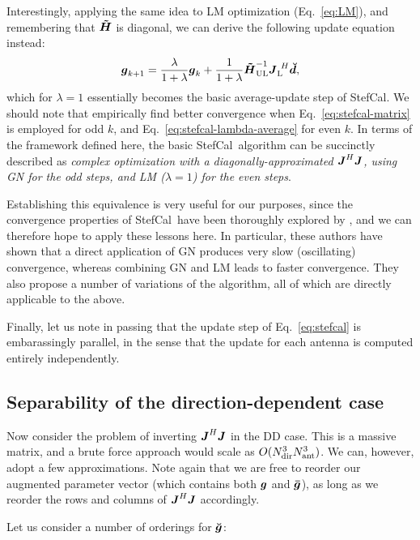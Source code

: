 \documentclass[useAMS,usenatbib]{mn2e}
\newcommand{\mat}[1]{{\bmath{#1}}}
\newcommand{\JJ}{\mat{J}} %
\newcommand{\HHa}{\mat{\tilde{H}}} %
\newcommand{\JHJ}{\JJ^H\JJ} %
\newcommand{\AUG}[1]{\bmath{\breve{#1}}}
\newcommand{\Gg}{\AUG{g}}
\newcommand{\Dd}{\AUG{d}}
\newcommand{\LEFT}{\mathrm{L}}
\newcommand{\UL}{\mathrm{UL}}%
\newcommand{\StefCal}{{\sc StefCal}}
\numberwithin{equation}{section} %
\begin{document}
Interestingly, applying the same idea to LM optimization (Eq.~\ref{eq:LM}), and remembering that $\HHa$ is 
diagonal, we can derive the following update equation instead:
\begin{equation}
\bmath{g}_{k+1} = \frac{\lambda}{1+\lambda}\bmath{g}_k + \frac{1}{1+\lambda} \HHa_{\UL}^{-1} \JJ_\LEFT^{~H} \Dd,
\label{eq:stefcal-lambda-average}
\end{equation}
which for $\lambda=1$ essentially becomes the basic average-update step of \StefCal. We should note that \citet{Stefcal}
empirically find better convergence when Eq.~\ref{eq:stefcal-matrix} is employed for odd $k$, and 
Eq.~\ref{eq:stefcal-lambda-average} for even $k$. In terms of the framework defined here, the basic \StefCal\ algorithm 
can be succinctly described as {\em complex optimization with a 
diagonally-approximated $\JHJ$, using GN for the odd steps, and LM ($\lambda=1$) for the even steps}.

Establishing this equivalence is 
very useful for our purposes, since the convergence properties of \StefCal\ have been thoroughly explored 
by \citet{Stefcal}, and we can therefore hope to apply these lessons here. In particular, these authors have shown 
that a direct application of GN produces very slow (oscillating) convergence, whereas combining GN and LM leads to faster convergence. They also propose a number of variations of the algorithm, all of which are 
directly applicable to the above.

Finally, let us note in passing that the update step of Eq.~\ref{eq:stefcal} is embarassingly parallel, in the sense 
that the update for each antenna is computed entirely independently.

\subsection{Separability of the direction-dependent case}

Now consider the problem of inverting $\JHJ$ in the DD case. This is a massive matrix, and a brute force 
approach would scale as $O(N_\mathrm{dir}^3N_\mathrm{ant}^3)$. We can, however, adopt a few approximations. Note again that we are 
free to reorder our augmented parameter vector (which contains both $\bmath{g}$ and $\bmath{\bar g}$), 
as long as we reorder the rows and columns of $\JHJ$ accordingly.

Let us consider a number of orderings for $\Gg$:
\end{document}
